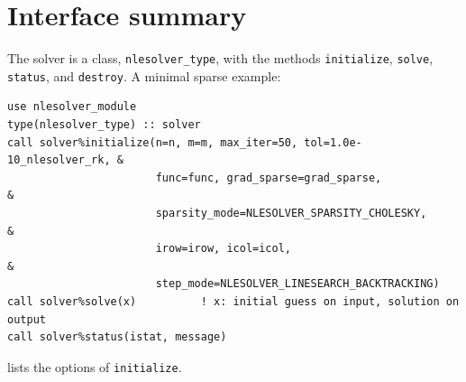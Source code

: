 \documentclass[11pt]{article}
\newcommand{\code}[1]{\texttt{#1}}
\begin{document}
\appendix
\section{Interface summary}
\label{sec:api}

The solver is a class, \code{nlesolver\_type}, with the methods \code{initialize}, \code{solve},
\code{status}, and \code{destroy}. A minimal sparse example:
\begin{lstlisting}
use nlesolver_module
type(nlesolver_type) :: solver
call solver%initialize(n=n, m=m, max_iter=50, tol=1.0e-10_nlesolver_rk, &
                       func=func, grad_sparse=grad_sparse,               &
                       sparsity_mode=NLESOLVER_SPARSITY_CHOLESKY,        &
                       irow=irow, icol=icol,                             &
                       step_mode=NLESOLVER_LINESEARCH_BACKTRACKING)
call solver%solve(x)          ! x: initial guess on input, solution on output
call solver%status(istat, message)
\end{lstlisting}
 lists the options of \code{initialize}.
\end{document}
